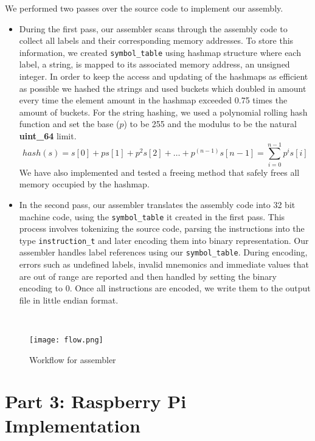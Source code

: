 \documentclass{article}
\begin{document}
We performed two passes over the source code to implement our assembly.
\begin{itemize}
    \item During the first pass, our assembler scans through the assembly code to collect all labels and their corresponding memory addresses. To store this information, we created \verb|symbol_table| using hashmap structure where each label, a string, is mapped to its associated memory address, an unsigned integer. In order to keep the access and updating of the hashmaps as efficient as possible we hashed the strings and used buckets which doubled in amount every time the element amount in the hashmap exceeded 0.75 times the amount of buckets. For the string hashing, we used a polynomial rolling hash function and set the base ($p$) to be 255 and the modulus to be the natural \textbf{uint\_64} limit.
$$
hash(s) = s[0] + p s[1] + p^2 s[2] + \dots + p^{(n-1)} s[n - 1]
        = \sum^{n - 1}_{i=0} p^i s[i]
$$
We have also implemented and tested a freeing method that safely frees all memory occupied by the hashmap.

    \item In the second pass, our assembler translates the assembly code into 32 bit machine code, using the \verb|symbol_table| it created in the first pass. This process involves tokenizing the source code, parsing the instructions into the type \verb|instruction_t| and later encoding them into binary representation. Our assembler handles label references using our \verb|symbol_table|. During encoding, errors such as undefined labels, invalid mnemonics and immediate values that are out of range are reported and then handled by setting the binary encoding to 0. Once all instructions are encoded, we write them to the output file in little endian format.
\end{itemize}
\\

\begin{figure}[h!]
    \centering
    \texttt{[image: flow.png]}
    \caption{Workflow for assembler}
    \label{fig:mnist-digits}
\end{figure}




\section{Part 3: Raspberry Pi Implementation}
\end{document}
